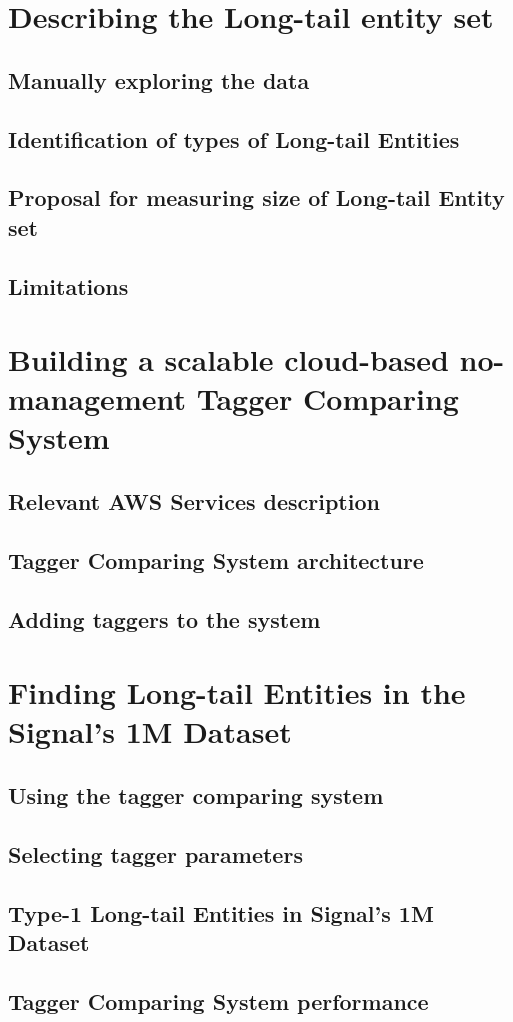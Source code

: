 \section{Describing the Long-tail entity set}
\subsection{Manually exploring the data}
\subsection{Identification of types of Long-tail Entities}
\subsection{Proposal for measuring size of Long-tail Entity set}
\subsection{Limitations}

\section{Building a scalable cloud-based no-management Tagger Comparing System}
\subsection{Relevant AWS Services description}
\subsection{Tagger Comparing System architecture}
\subsection{Adding taggers to the system}

\section{Finding Long-tail Entities in the Signal's 1M Dataset}
\subsection{Using the tagger comparing system}
\subsection{Selecting tagger parameters}
\subsection{Type-1 Long-tail Entities in Signal's 1M Dataset}
\subsection{Tagger Comparing System performance}